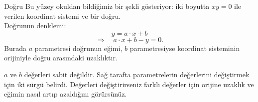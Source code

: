 \begin{surferPage}[Doğru]{Doğru}
Bu yüzey okuldan bildiğimiz bir şekli gösteriyor: iki boyutta $xy=0$ ile verilen koordinat sistemi ve bir doğru. \\ Doğrunun denklemi:
\[y=a\cdot x + b\]
\[ \Rightarrow \quad a\cdot x +b -y=0.\]
Burada  $a$ parametresi doğrunun eğimi,  $b$ parametresiyse koordinat sisteminin orijiniyle doğru arasındaki uzaklıktır.
\newline \newline

$a$ ve $b$ değerleri sabit değildir. Sağ tarafta parametrelerin değerlerini değiştirmek için iki sürgü belirdi. Değerleri değiştirirseniz farklı değerler için orijine uzaklık ve eğimin nasıl artıp azaldığını görürsünüz.
\end{surferPage}
